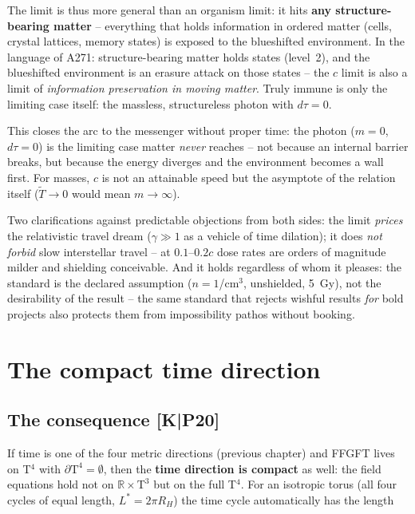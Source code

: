 \documentclass[11pt]{report}
\begin{document}
The limit is thus more general than an organism limit: it hits
\textbf{any structure-bearing matter} -- everything that holds
information in ordered matter (cells, crystal lattices, memory
states) is exposed to the blueshifted environment. In the language
of A271: structure-bearing matter holds states (level~2), and the
blueshifted environment is an erasure attack on those states --
the $c$ limit is also a limit of \emph{information preservation in
moving matter}. Truly immune is only the limiting case itself: the
massless, structureless photon with $d\tau = 0$.

This closes the arc to the messenger without proper time: the
photon ($m = 0$, $d\tau = 0$) is the limiting case matter
\emph{never} reaches -- not because an internal barrier breaks,
but because the energy diverges and the environment becomes a wall
first. For masses, $c$ is not an attainable speed but the
asymptote of the relation itself ($\tilde T \to 0$ would mean
$m \to \infty$).

Two clarifications against predictable objections from both sides:
the limit \emph{prices} the relativistic travel dream
($\gamma \gg 1$ as a vehicle of time dilation); it does
\emph{not forbid} slow interstellar travel -- at $0.1$--$0.2c$
dose rates are orders of magnitude milder and shielding
conceivable. And it holds regardless of whom it pleases: the
standard is the declared assumption ($n = 1$/cm$^3$, unshielded,
5~Gy), not the desirability of the result -- the same standard
that rejects wishful results \emph{for} bold projects also
protects them from impossibility pathos without booking.

\chapter{The compact time direction}

\section{The consequence [K|P20]}

If time is one of the four metric directions (previous chapter) and
FFGFT lives on T$^4$ with $\partial\text{T}^4 = \emptyset$, then the
\textbf{time direction is compact} as well: the field equations
hold not on $\mathbb{R}\times\text{T}^3$ but on the full T$^4$. For
an isotropic torus (all four cycles of equal length,
$L^{*} = 2\pi R_H$) the time cycle automatically has the length
\end{document}
